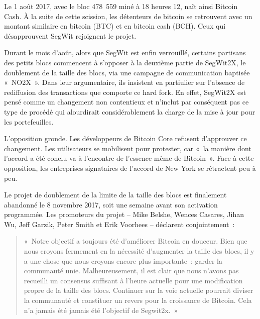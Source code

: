 Le 1\ier{} août 2017, avec le bloc 478~559 miné à 18 heures 12, naît ainsi Bitcoin Cash. À la suite de cette scission, les détenteurs de bitcoin se retrouvent avec un montant similaire en bitcoin (BTC) et en bitcoin cash (BCH). Ceux qui désapprouvent SegWit rejoignent le projet.

Durant le mois d'août, alors que SegWit est enfin verrouillé, certains partisans des petits blocs commencent à s'opposer à la deuxième partie de SegWit2X, le doublement de la taille des blocs, via une campagne de communication baptisée «~NO2X~». Dans leur argumentaire, ils insistent en partiulier sur l'absence de rediffusion des transactions que comporte ce hard fork. En effet, SegWit2X est pensé comme un changement non contentieux et n'inclut par conséquent pas ce type de procédé qui alourdirait considérablement la charge de la mise à jour pour les portefeuilles.

L'opposition gronde. Les développeurs de Bitcoin Core refusent d'approuver ce changement. Les utilisateurs se mobilisent pour protester, car «~la manière dont l'accord a été conclu va à l'encontre de l'essence même de Bitcoin~». Face à cette opposition, les entreprises signataires de l'accord de New York se rétractent peu à peu.

Le projet de doublement de la limite de la taille des blocs est finalement abandonné le 8 novembre 2017, soit une semaine avant son activation programmée. Les promoteurs du projet -- Mike Belshe, Wences Casares, Jihan Wu, Jeff Garzik, Peter Smith et Erik Voorhees -- déclarent conjointement~:

\begin{quote}
«~Notre objectif a toujours été d'améliorer Bitcoin en douceur. Bien que nous croyons fermement en la nécessité d'augmenter la taille des blocs, il y a une chose que nous croyons encore plus importante~: garder la communauté unie. Malheureusement, il est clair que nous n'avons pas recueilli un consensus suffisant à l'heure actuelle pour une modification propre de la taille des blocs. Continuer sur la voie actuelle pourrait diviser la communauté et constituer un revers pour la croissance de Bitcoin. Cela n'a jamais été jamais été l'objectif de Segwit2x.~»
\end{quote}

